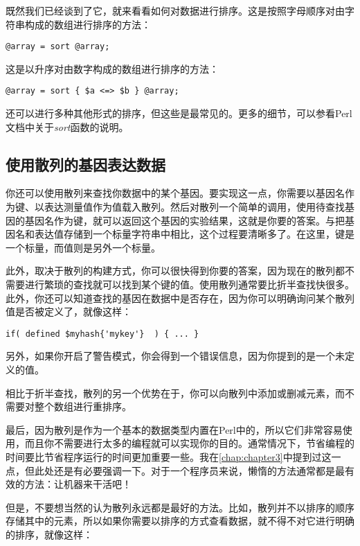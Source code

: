 既然我们已经谈到了它，就来看看如何对数据进行排序。这是按照字母顺序对由字符串构成的数组进行排序的方法：

\begin{lstlisting}
@array = sort @array;
\end{lstlisting}

这是以升序对由数字构成的数组进行排序的方法：

\begin{lstlisting}
@array = sort { $a <=> $b } @array;
\end{lstlisting}

还可以进行多种其他形式的排序，但这些是最常见的。更多的细节，可以参看Perl文档中关于\textit{sort}函数的说明。

\subsection{使用散列的基因表达数据}
你还可以使用散列来查找你数据中的某个基因。要实现这一点，你需要以基因名作为键、以表达测量值作为值载入散列。然后对散列一个简单的调用，使用待查找基因的基因名作为键，就可以返回这个基因的实验结果，这就是你要的答案。与把基因名和表达值存储到一个标量字符串中相比，这个过程要清晰多了。在这里，键是一个标量，而值则是另外一个标量。

此外，取决于散列的构建方式，你可以很快得到你要的答案，因为现在的散列都不需要进行繁琐的查找就可以找到某个键的值。使用散列通常要比折半查找快很多。此外，你还可以知道查找的基因在数据中是否存在，因为你可以明确询问某个散列值是否被定义了，就像这样：

\begin{lstlisting}
if( defined $myhash{'mykey'}  ) { ... }
\end{lstlisting}

另外，如果你开启了警告模式，你会得到一个错误信息，因为你提到的是一个未定义的值。

相比于折半查找，散列的另一个优势在于，你可以向散列中添加或删减元素，而不需要对整个数组进行重排序。

最后，因为散列是作为一个基本的数据类型内置在Perl中的，所以它们非常容易使用，而且你不需要进行太多的编程就可以实现你的目的。通常情况下，节省编程的时间要比节省程序运行的时间更加重要一些。我在\autoref{chap:chapter3}中提到过这一点，但此处还是有必要强调一下。对于一个程序员来说，懒惰的方法通常都是最有效的方法：让机器来干活吧！

但是，不要想当然的认为散列永远都是最好的方法。比如，散列并不以排序的顺序存储其中的元素，所以如果你需要以排序的方式查看数据，就不得不对它进行明确的排序，就像这样：

